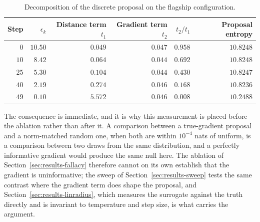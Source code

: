 \begin{table}[htbp]
    \centering
    \small
    \begin{tabular}{rrrrrr}
        \toprule
        Step & $\epsilon_k$ & Distance term $t_1$ & Gradient term $t_2$ & $t_2/t_1$ & Proposal entropy \\
        \midrule
        $0$  & $10.50$ & $0.049$ & $0.047$ & $0.958$ & $10.8248$ \\
        $10$ & $8.42$  & $0.064$ & $0.044$ & $0.692$ & $10.8248$ \\
        $25$ & $5.30$  & $0.104$ & $0.044$ & $0.430$ & $10.8247$ \\
        $40$ & $2.19$  & $0.274$ & $0.046$ & $0.168$ & $10.8236$ \\
        $49$ & $0.10$  & $5.572$ & $0.046$ & $0.008$ & $10.2488$ \\
        \bottomrule
    \end{tabular}
    \caption[Proposal sharpness over the flagship schedule.]{Decomposition of the discrete proposal on the flagship configuration.}
    \label{tab:proposal-sharpness}
\end{table}

The consequence is immediate, and it is why this measurement is placed before the ablation rather than after it. A comparison between a true-gradient proposal and a norm-matched random one, when both are within $10^{-4}$ nats of uniform, is a comparison between two draws from the same distribution, and a perfectly informative gradient would produce the same null here. The ablation of Section~\ref{sec:results-fallacy} therefore cannot on its own establish that the gradient is uninformative; the sweep of Section~\ref{sec:results-sweep} tests the same contrast where the gradient term does shape the proposal, and Section~\ref{sec:results-linradius}, which measures the surrogate against the truth directly and is invariant to temperature and step size, is what carries the argument.

